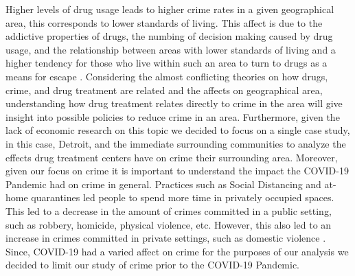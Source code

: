 \documentclass[12pt]{article}
\begin{document}
Higher levels of drug usage leads to higher crime rates in a given geographical area, this corresponds to lower standards of living. This affect is due to the addictive properties of drugs, the numbing of decision making caused by drug usage, and the relationship between areas with lower standards of living and a higher tendency for those who live within such an area to turn to drugs as a means for escape \cite{drugs_and_crime}. Considering the almost conflicting theories on how drugs, crime, and drug treatment are related and the affects on geographical area, understanding how drug treatment relates directly to crime in the area will give insight into possible policies to reduce crime in an area. Furthermore, given the lack of economic research on this topic we decided to focus on a single case study, in this case, Detroit, and the immediate surrounding communities to analyze the effects drug treatment centers have on crime their surrounding area. Moreover, given our focus on crime it is important to understand the impact the COVID-19 Pandemic had on crime in general. Practices such as Social Distancing and at-home quarantines led people to spend more time in privately occupied spaces. This led to a decrease in the amount of crimes committed in a public setting, such as robbery, homicide, physical violence, etc. However, this also led to an increase in crimes committed in private settings, such as domestic violence \cite{covid_and_crime}. Since, COVID-19 had a varied affect on crime for the purposes of our analysis we decided to limit our study of crime prior to the COVID-19 Pandemic.
\end{document}
